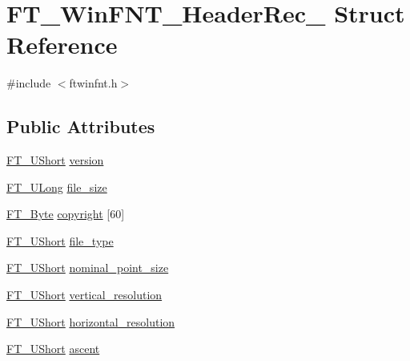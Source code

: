 \hypertarget{struct_f_t___win_f_n_t___header_rec__}{\section{F\-T\-\_\-\-Win\-F\-N\-T\-\_\-\-Header\-Rec\-\_\- Struct Reference}
\label{struct_f_t___win_f_n_t___header_rec__}
}


{\ttfamily \#include $<$ftwinfnt.\-h$>$}

\subsection*{Public Attributes}
\begin{DoxyCompactItemize}
\item 
\hyperlink{fttypes_8h_a937f6c17cf5ffd09086d8610c37b9f58}{F\-T\-\_\-\-U\-Short} \hyperlink{struct_f_t___win_f_n_t___header_rec___a88f8539fc11d2fac60f172553caa5b8d}{version}
\item 
\hyperlink{fttypes_8h_a4fac88bdba78eb76b505efa6e4fbf3f5}{F\-T\-\_\-\-U\-Long} \hyperlink{struct_f_t___win_f_n_t___header_rec___ae311838f941463d96f4ee570de58a359}{file\-\_\-size}
\item 
\hyperlink{fttypes_8h_a51f26183ca0c9f4af958939648caeccd}{F\-T\-\_\-\-Byte} \hyperlink{struct_f_t___win_f_n_t___header_rec___a289a835480eac30710dae8bfc04c6ae7}{copyright} \mbox{[}60\mbox{]}
\item 
\hyperlink{fttypes_8h_a937f6c17cf5ffd09086d8610c37b9f58}{F\-T\-\_\-\-U\-Short} \hyperlink{struct_f_t___win_f_n_t___header_rec___a0ca7a317967750673fd06f98af5f8329}{file\-\_\-type}
\item 
\hyperlink{fttypes_8h_a937f6c17cf5ffd09086d8610c37b9f58}{F\-T\-\_\-\-U\-Short} \hyperlink{struct_f_t___win_f_n_t___header_rec___a98fd9a9f31cdbdfa570fba3e0094dfdc}{nominal\-\_\-point\-\_\-size}
\item 
\hyperlink{fttypes_8h_a937f6c17cf5ffd09086d8610c37b9f58}{F\-T\-\_\-\-U\-Short} \hyperlink{struct_f_t___win_f_n_t___header_rec___ad8f76384c2eec492a559e66de170baba}{vertical\-\_\-resolution}
\item 
\hyperlink{fttypes_8h_a937f6c17cf5ffd09086d8610c37b9f58}{F\-T\-\_\-\-U\-Short} \hyperlink{struct_f_t___win_f_n_t___header_rec___a0adc07f0f285c8c2350c0078d71ace9a}{horizontal\-\_\-resolution}
\item 
\hyperlink{fttypes_8h_a937f6c17cf5ffd09086d8610c37b9f58}{F\-T\-\_\-\-U\-Short} \hyperlink{struct_f_t___win_f_n_t___header_rec___a99125a3ce627cd8295c50c6019ec2f42}{ascent}

\end{DoxyCompactItemize}
